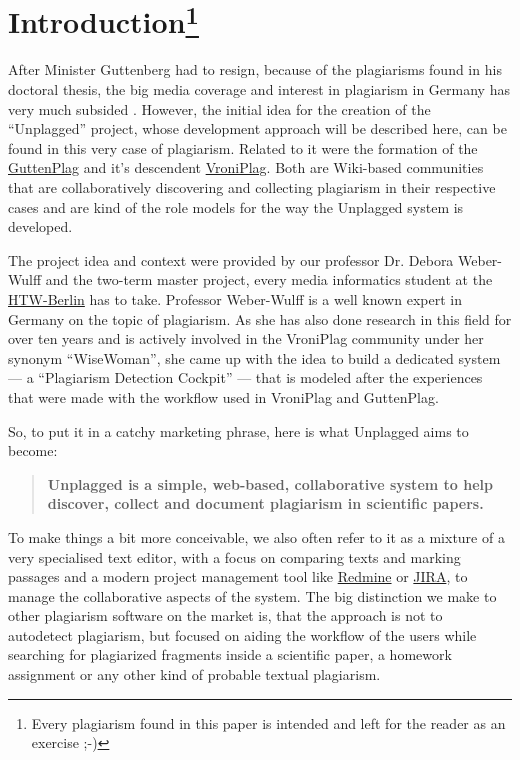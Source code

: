 \chapter*{Introduction\footnote{Every plagiarism found in this paper is intended and left for the reader as an exercise ;-)}}
After Minister Guttenberg had to resign, because of the plagiarisms found in his doctoral thesis,
the big media coverage and interest in plagiarism in Germany has very much subsided 
\citep{Google2012}. However, the initial idea for the 
creation of the \enquote{Unplagged} project, whose development approach will be described here, can be found in this 
very case of plagiarism. Related to it were the formation of the
\href{http://de.guttenplag.wikia.com/wiki/GuttenPlag\_Wiki}{GuttenPlag} and it's descendent 
\href{http://de.vroniplag.wikia.com/wiki/Home}{VroniPlag}. Both are Wiki-based communities that are collaboratively 
discovering and collecting plagiarism in their respective cases and are kind of the role models for the way the
Unplagged system is developed.

The project idea and context were provided by our professor Dr. Debora Weber-Wulff and the two-term master project,
every media informatics student at the \href{http://htw-berlin.de/}{HTW-Berlin} has to take. Professor Weber-Wulff is 
a well known expert in Germany on the topic of plagiarism. As she has also done research in this 
field for over ten years and is actively involved in the VroniPlag community under her 
synonym \enquote{WiseWoman}\citep{Spiegel-Online2011}, she came up with the idea to build a dedicated system --- a 
\enquote{Plagiarism Detection Cockpit}\citep{Weber-Wulff2011} --- 
that is modeled after the experiences that were made with the workflow used in VroniPlag and GuttenPlag.

So, to put it in a catchy marketing phrase, here is what Unplagged aims to become: 

\begin{quote}
\textbf{Unplagged is a simple, web-based, collaborative system to help discover, collect and 
document plagiarism in scientific papers.}
\end{quote}

To make things a bit more conceivable, we also often refer to it as a mixture of a very specialised text editor, with a focus on 
comparing texts and marking 
passages and a modern project management tool like \href{http://www.redmine.org/}{Redmine} or 
\href{http://www.atlassian.com/JIRA}{JIRA}, 
to manage the collaborative aspects of the system. The big distinction we make to other plagiarism software on the market is, 
that the approach is not to autodetect plagiarism, but focused on aiding the workflow of the users while  
searching for plagiarized
fragments inside a scientific paper, a homework assignment or any other kind of probable textual plagiarism.

